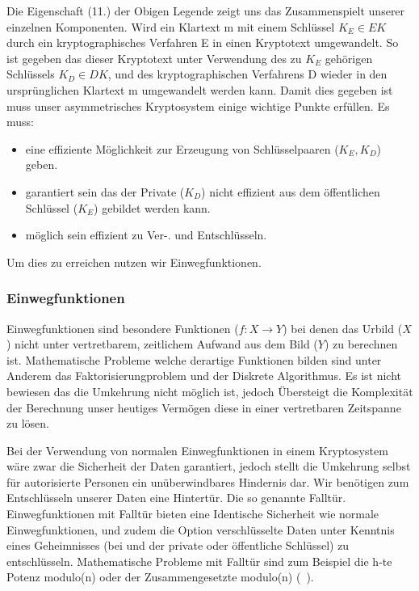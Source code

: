 \documentclass[paper=a4,11pt,german]{scrartcl} %
\begin{document}
Die Eigenschaft (11.) der Obigen Legende zeigt uns das Zusammenspielt unserer einzelnen Komponenten. Wird ein Klartext m mit einem Schlüssel $K_E \in EK$ durch ein kryptographisches Verfahren E in einen Kryptotext umgewandelt. So ist gegeben das dieser Kryptotext unter Verwendung des zu $K_E$ gehörigen Schlüssels $K_D \in DK$, und des kryptographischen Verfahrens D wieder in den ursprünglichen Klartext m umgewandelt werden kann. Damit dies gegeben ist muss unser asymmetrisches Kryptosystem einige wichtige Punkte erfüllen.
Es muss:
\newpage
\begin{itemize}
\item eine effiziente Möglichkeit zur Erzeugung von Schlüsselpaaren ($K_E,K_D$) geben.
\item garantiert sein das der Private ($K_D$) nicht effizient aus dem öffentlichen Schlüssel ($K_E$) gebildet werden kann.
\item möglich sein effizient zu Ver-. und Entschlüsseln.
\end{itemize}
Um dies zu erreichen nutzen wir Einwegfunktionen.
\subsubsection{Einwegfunktionen}
Einwegfunktionen sind besondere Funktionen ($f: X \rightarrow Y$) bei denen das Urbild ($X$) nicht unter vertretbarem, zeitlichem Aufwand aus dem Bild ($Y$) zu berechnen ist. Mathematische Probleme welche derartige Funktionen bilden sind unter Anderem das Faktorisierungproblem und der Diskrete Algorithmus. Es ist nicht bewiesen das die Umkehrung nicht möglich ist, jedoch Übersteigt die Komplexität der Berechnung unser heutiges Vermögen diese in einer vertretbaren Zeitspanne zu lösen.

Bei der Verwendung von normalen Einwegfunktionen in einem Kryptosystem wäre zwar die Sicherheit der Daten garantiert, jedoch stellt die Umkehrung selbst für autorisierte Personen ein unüberwindbares Hindernis dar. Wir benötigen zum Entschlüsseln unserer Daten eine Hintertür. Die so genannte Falltür. Einwegfunktionen mit Falltür bieten eine Identische Sicherheit wie normale Einwegfunktionen, und zudem die Option verschlüsselte Daten unter Kenntnis eines Geheimnisses (bei und der private oder öffentliche Schlüssel) zu entschlüsseln. Mathematische Probleme mit Falltür sind zum Beispiel die h-te Potenz modulo(n) oder der Zusammengesetzte modulo(n) (~\cite{Eckert13}). 
\end{document}
